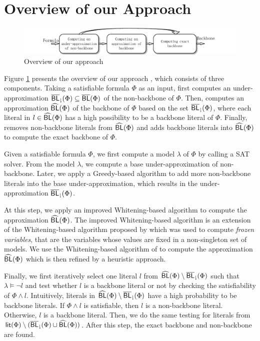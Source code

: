 \section{Overview of our Approach}\label{sec:walg}
\begin{figure}
\centering
    \includegraphics[scale=0.9]{Framework}
   \caption{Overview of our approach}
   \label{flow}
\end{figure}

Figure \ref{flow} presents the overview of our approach \tool, which consists of three components. Taking a satisfiable formula
$\Phi$ as an input, \tool first computes an under-approximation ${\sf \overline{BL}_\downharpoonright}(\Phi)\subseteq \overline{\textsf{BL}}(\Phi)$ of the non-backbone of
$\Phi$. Then, \tool computes an approximation ${\sf \widehat{BL}}(\Phi)$ of the backbone of $\Phi$ based on the set ${\sf \overline{BL}_\downharpoonright}(\Phi)$, where each literal in $l\in {\sf \widehat{BL}}(\Phi)$ has a high possibility to be a backbone literal of $\Phi$.
Finally, \tool removes non-backbone literals from ${\sf \widehat{BL}}(\Phi)$ and adds backbone literals into ${\sf \widehat{BL}}(\Phi)$ to compute the exact backbone of $\Phi$.

\medskip
{}
Given a satisfiable formula $\Phi$, we first compute a model $\lambda$ of $\Phi$ by calling a SAT solver.
From the model $\lambda$, we compute a base under-approximation of non-backbone.
Later, we apply a Greedy-based algorithm to add more non-backbone literals into the base under-approximation, which results in the
under-approximation ${\sf \overline{BL}_\downharpoonright}(\Phi)$.



\medskip
{}
At this step, we apply an improved Whitening-based algorithm to compute the approximation ${\sf \widehat{BL}}(\Phi)$.
The improved Whitening-based algorithm is an extension of the Whitening-based algorithm proposed by \cite{LMZ09} which
was used to compute \emph{frozen variables}, that are the variables whose values are fixed in a non-singleton set of models.
We use the Whitening-based algorithm of \cite{LMZ09} to compute the approximation ${\sf \widehat{BL}}(\Phi)$ which is then refined by
a heuristic approach.


\medskip
{}
Finally, we first iteratively select one literal $l$ from ${\sf \widehat{BL}}(\Phi)\setminus {\sf \overline{BL}_\downharpoonright}(\Phi)$ such that $\lambda \models \neg l$ and test whether
$l$ is a backbone literal or not by checking the satisfiability of $\Phi\wedge l$. Intuitively, literals in ${\sf \widehat{BL}}(\Phi)\setminus {\sf \overline{BL}_\downharpoonright}(\Phi)$ have a high probability to be backbone literals.
If $\Phi\wedge l$ is satisfiable, then $l$ is a non-backbone literal.
Otherwise, $l$ is a backbone literal. Then, we do the same testing for literals from $\textsf{lit}(\Phi)\setminus ({\sf \overline{BL}_\downharpoonright}(\Phi)\cup{\sf \widehat{BL}}(\Phi))$.
After this step, the exact backbone and non-backbone are found.



